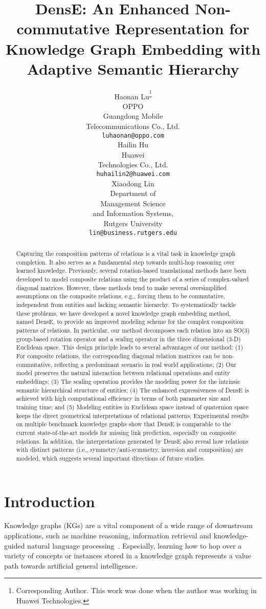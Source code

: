 \documentclass[11pt]{article}
\title{DensE: An Enhanced Non-commutative Representation for Knowledge Graph Embedding with Adaptive Semantic Hierarchy}
\author{Haonan Lu\textsuperscript{\thanks{Corresponding Author. This work was done when the author was working in Huawei Technologies.}} \\
  OPPO \\Guangdong Mobile\\Telecommunications Co., Ltd. \\
  \texttt{luhaonan@oppo.com} \\\And
  Hailin Hu \\
  Huawei \\Technologies Co., Ltd. \\
  \texttt{huhailin2@huawei.com} \\\And
  Xiaodong Lin \\
  Department of\\Management Science\\and Information Systems, \\Rutgers University \\
  \texttt{lin@business.rutgers.edu} \\}
\begin{document}
\maketitle



\begin{abstract}
Capturing the composition patterns of relations is a vital task in knowledge graph completion. It also serves as a fundamental step towards multi-hop reasoning over learned knowledge. Previously, several rotation-based translational methods have been developed to model composite relations using the product of a series of complex-valued diagonal matrices. However, these methods tend to make several oversimplified assumptions on the composite relations, e.g., forcing them to be commutative, independent from entities and lacking semantic hierarchy. To systematically tackle these problems, we have developed a novel knowledge graph embedding method, named DensE, to provide an improved modeling scheme for the complex composition patterns of relations. In particular, our method decomposes each relation into an SO(3) group-based rotation operator and a scaling operator in the three dimensional (3-D) Euclidean space. This design principle leads to several advantages of our method: (1) For composite relations, the corresponding diagonal relation matrices can be non-commutative, reflecting a predominant scenario in real world applications; (2) Our model preserves the natural interaction between relational operations and entity embeddings; (3) The scaling operation provides the modeling power for the intrinsic semantic hierarchical structure of entities; (4) The enhanced expressiveness of DensE is achieved with high computational efficiency in terms of both parameter size and training time; and (5) Modeling entities in Euclidean space instead of quaternion space keeps the direct geometrical interpretations of relational patterns. Experimental results on multiple benchmark knowledge graphs show that DensE is comparable to the current state-of-the-art models for missing link prediction, especially on composite relations. In addition, the interpretations generated by DensE also reveal how relations with distinct patterns (i.e., symmetry/anti-symmetry, inversion and composition) are modeled, which suggests several important directions of future studies.
\end{abstract}

\section{Introduction}
Knowledge graphs (KGs) are a vital component of a wide range of downstream applications, such as machine reasoning, information retrieval and knowledge-guided natural language processing~\cite{ji2020survey, Zhang2019ERNIEEL, yang-etal-2019-enhancing-pre, Lin2019KagNetKG}. Especially, learning how to hop over a variety of concepts or instances stored in a knowledge graph represents a value path towards artificial general intelligence.
\end{document}
